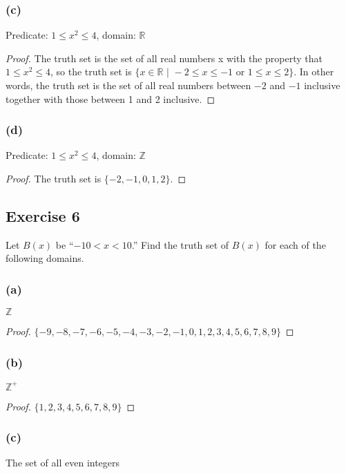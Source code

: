 \documentclass[14pt]{extarticle}
\newcommand{\R}{\mathbb{R}}
\newcommand{\Z}{\mathbb{Z}}
\begin{document}
\subsubsection{(c)}
Predicate: $1 \leq x^2 \leq 4$, domain: $\R$

\begin{proof}
    The truth set is the set of all real numbers x with the property that $1 \leq x^2 \leq 4$, so the truth set is $\{x \in \R \,\, | \,\, -2 \leq x \leq -1 \text{ or } 1 \leq x \leq 2\}$. In other words, the truth set is the set of all real numbers between $-2$ and $-1$ inclusive together with those between 1 and 2 inclusive.
\end{proof}

\subsubsection{(d)}
Predicate: $1 \leq x^2 \leq 4$, domain: $\Z$

\begin{proof}
    The truth set is $\{-2, -1, 0, 1, 2\}$.
\end{proof}

\subsection{Exercise 6}
Let $B(x)$ be “$-10 < x < 10$.” Find the truth set of $B(x)$ for each of the following domains.

\subsubsection{(a)}
$\Z$

\begin{proof}
    $\{-9, -8, -7, -6, -5, -4, -3, -2, -1, 0, 1, 2, 3, 4, 5, 6, 7, 8, 9\}$
\end{proof}

\subsubsection{(b)}
$\Z^+$

\begin{proof}
    $\{1, 2, 3, 4, 5, 6, 7, 8, 9\}$
\end{proof}

\subsubsection{(c)}
The set of all even integers
\end{document}
